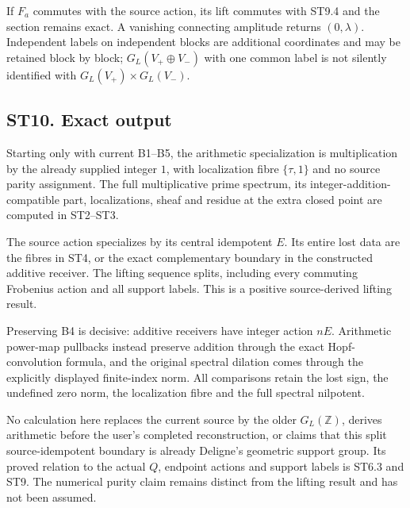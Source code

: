 If \(F_a\) commutes with the source action, its lift commutes with ST9.4
and the section remains exact. A vanishing connecting amplitude returns
\((0,\lambda)\). Independent labels on independent blocks are additional
coordinates and may be retained block by block; \(G_L(V_+\oplus V_-)\)
with one common label is not silently identified with
\(G_L(V_+)\times G_L(V_-)\).

\subsection{ST10. Exact output}\label{st10.-exact-output}

Starting only with current B1--B5, the arithmetic specialization is
multiplication by the already supplied integer \(1\), with localization
fibre \(\{\tau,1\}\) and no source parity assignment. The full
multiplicative prime spectrum, its integer-addition-compatible part,
localizations, sheaf and residue at the extra closed point are computed
in ST2--ST3.

The source action specializes by its central idempotent \(E\). Its
entire lost data are the fibres in ST4, or the exact complementary
boundary in the constructed additive receiver. The lifting sequence
splits, including every commuting Frobenius action and all support
labels. This is a positive source-derived lifting result.

Preserving B4 is decisive: additive receivers have integer action
\(nE\). Arithmetic power-map pullbacks instead preserve addition through
the exact Hopf-convolution formula, and the original spectral dilation
comes through the explicitly displayed finite-index norm. All
comparisons retain the lost sign, the undefined zero norm, the
localization fibre and the full spectral nilpotent.

No calculation here replaces the current source by the older
\(G_L(\mathbb Z)\), derives arithmetic before the user's completed
reconstruction, or claims that this split source-idempotent boundary is
already Deligne's geometric support group. Its proved relation to the
actual \(Q\), endpoint actions and support labels is ST6.3 and ST9. The
numerical purity claim remains distinct from the lifting result and has
not been assumed.
